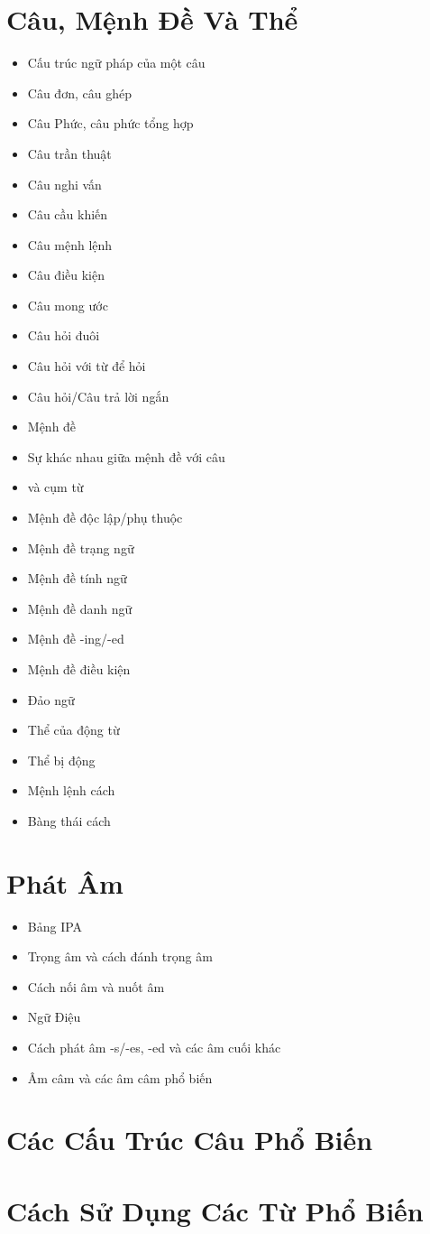 \chapter{Câu, Mệnh Đề Và Thể}
\begin{multicols*}{2}
\begin{itemize}
    \item Cấu trúc ngữ pháp của một câu
    \item Câu đơn, câu ghép
    \item Câu Phức, câu phức tổng hợp
    \item Câu trần thuật
    \item Câu nghi vấn
    \item Câu cầu khiến
    \item Câu mệnh lệnh
    \item Câu điều kiện
    \item Câu mong ước
    \item Câu hỏi đuôi
    \item Câu hỏi với từ để hỏi
    \item Câu hỏi/Câu trả lời ngắn
    \item Mệnh đề
    \item Sự khác nhau giữa mệnh đề với câu   
    \item và cụm từ
    \item Mệnh đề độc lập/phụ thuộc
    \item Mệnh đề trạng ngữ
    \item Mệnh đề tính ngữ
    \item Mệnh đề danh ngữ
    \item Mệnh đề -ing/-ed
    \item Mệnh đề điều kiện
    \item Đảo ngữ
    \item Thể của động từ
    \item Thể bị động
    \item Mệnh lệnh cách
    \item Bàng thái cách
\end{itemize}
\end{multicols*}

\chapter{Phát Âm}
\begin{multicols*}{2}
\begin{itemize}
    \item Bảng IPA
    \item Trọng âm và cách đánh trọng âm
    \item Cách nối âm và nuốt âm
    \item Ngữ Điệu
    \item Cách phát âm -s/-es, -ed và các âm cuối khác
    \item Âm câm và các âm câm phổ biến
\end{itemize}
\end{multicols*}

\chapter{Các Cấu Trúc Câu Phổ Biến}
\chapter{Cách Sử Dụng Các Từ Phổ Biến}
